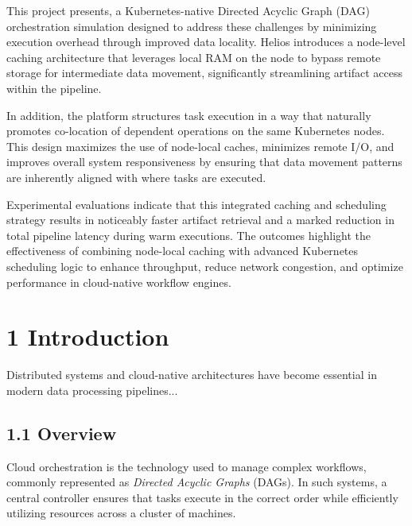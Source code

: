 \documentclass[12pt,a4paper]{report}
\begin{document}
This project presents, a Kubernetes-native Directed Acyclic Graph (DAG) orchestration simulation designed to address these challenges by minimizing execution overhead through improved data locality. Helios introduces a node-level caching architecture that leverages local RAM on the node to bypass remote storage for intermediate data movement, significantly streamlining artifact access within the pipeline.

In addition, the platform structures task execution in a way that naturally promotes co-location of dependent operations on the same Kubernetes nodes. This design maximizes the use of node-local caches, minimizes remote I/O, and improves overall system responsiveness by ensuring that data movement patterns are inherently aligned with where tasks are executed.

Experimental evaluations indicate that this integrated caching and scheduling strategy results in noticeably faster artifact retrieval and a marked reduction in total pipeline latency during warm executions. The outcomes highlight the effectiveness of combining node-local caching with advanced Kubernetes scheduling logic to enhance throughput, reduce network congestion, and optimize performance in cloud-native workflow engines.

\newpage
\tableofcontents

\newpage
{}

\chapter{1 \hspace{0.2cm} Introduction}
Distributed systems and cloud-native architectures have become essential in modern data processing pipelines...

\section*{1.1 Overview}
Cloud orchestration is the technology used to manage complex workflows, commonly represented as \textit{Directed Acyclic Graphs} (DAGs). In such systems, a central controller ensures that tasks execute in the correct order while efficiently utilizing resources across a cluster of machines.
\end{document}
